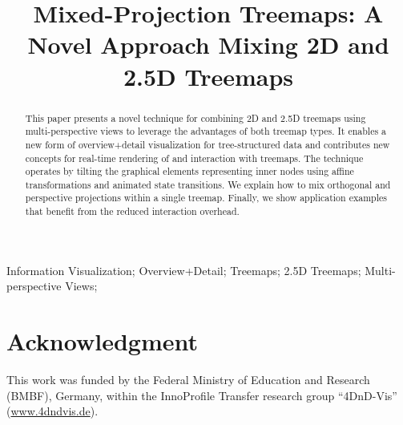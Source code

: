 \documentclass[10pt, conference, compsocconf]{IEEEtran}
\begin{document}
\title{Mixed-Projection Treemaps: A Novel Approach Mixing 2D and 2.5D Treemaps}

\author{%
}

\maketitle

\begin{abstract}
This paper presents a novel technique for combining 2D and 2.5D treemaps using multi-perspective views to leverage the advantages of both treemap types.
It enables a new form of overview+detail visualization for tree-structured data and contributes new concepts for real-time rendering of and interaction with treemaps.
The technique operates by tilting the graphical elements representing inner nodes using affine transformations and animated state transitions.
We explain how to mix orthogonal and perspective projections within a single treemap.
Finally, we show application examples that benefit from the reduced interaction overhead.
\end{abstract}

\begin{IEEEkeywords}
Information Visualization; Overview+Detail; Treemaps; 2.5D Treemaps; Multi-perspective Views;
\end{IEEEkeywords}

\IEEEpeerreviewmaketitle







\balance

\section*{Acknowledgment}
\noindent
This work was funded by the Federal Ministry of Education and Research (BMBF), Germany, within the InnoProfile Transfer research group \enquote{4DnD-Vis} (\href{www.4dndvis.de}{www.4dndvis.de}).



\end{document}
